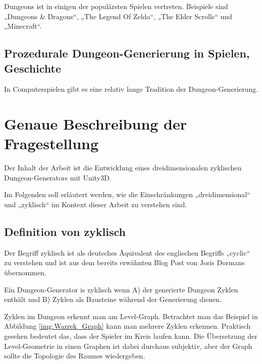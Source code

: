 Dungeons ist in einigen der populärsten Spielen vertreten. Beispiele sind „Dungeons \& Dragons“, „The Legend Of Zelda“, „The Elder Scrolls“ und „Minecraft“.


\subsection{Prozedurale Dungeon-Generierung in Spielen, Geschichte}

In Computerspielen gibt es eine relativ lange Tradition der Dungeon-Generierung.


\section{Genaue Beschreibung der Fragestellung}

Der Inhalt der Arbeit ist die Entwicklung eines dreidimensionalen zyklischen Dungeon-Generators mit Unity3D. 

Im Folgenden soll erläutert werden, wie die Einschränkungen „dreidimensional“ und „zyklisch“ im Kontext dieser Arbeit 
zu verstehen sind.

\subsection{Definition von zyklisch}\label{c.weitereskapitel}

Der Begriff zyklisch ist als deutsches Äquivalent des englischen Begriffs „cyclic“ zu verstehen und ist aus dem bereits erwähnten Blog Post von Joris Dormans \cite{blogCyclic} übernommen. 

Ein Dungeon-Generator is zyklisch wenn A) der generierte Dungeon Zyklen enthält und B) Zyklen als Bausteine während der Generierung dienen.


Zyklen im Dungeon erkennt man am Level-Graph. Betrachtet man das Beispiel in Abbildung \ref{img.Warrek_Graph} kann man mehrere Zyklen erkennen. Praktisch gesehen bedeutet das, dass der Spieler im Kreis laufen kann. Die Übersetzung der Level-Geometrie in einen Graphen ist dabei durchaus subjektiv, aber der Graph sollte die Topologie des Raumes wiedergeben. 

